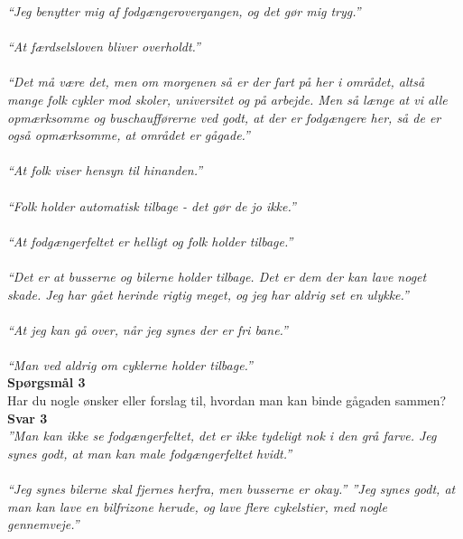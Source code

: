   \emph{“Jeg benytter mig af fodgængerovergangen, og det gør mig tryg.”}
~\\\\
  \emph{“At færdselsloven bliver overholdt.”}
~\\\\
  \emph{“Det må være det, men om morgenen så er der fart på her i området, altså mange folk cykler mod skoler, universitet og på arbejde. Men så længe at vi alle opmærksomme og buschaufførerne ved godt, at der er fodgængere her, så de er også opmærksomme, at området er gågade.”}
~\\\\
  \emph{“At folk viser hensyn til hinanden.”}
~\\\\
  \emph{“Folk holder automatisk tilbage - det gør de jo ikke.”}
~\\\\
  \emph{“At fodgængerfeltet er helligt og folk holder tilbage.”}
~\\\\
  \emph{“Det er at busserne og bilerne holder tilbage. Det er dem der kan lave noget skade. Jeg har gået herinde rigtig meget, og jeg har aldrig set en ulykke.”}
~\\\\
  \emph{“At jeg kan gå over, når jeg synes der er fri bane.”}
~\\\\
  \emph{“Man ved aldrig om cyklerne holder tilbage.”}
  ~\\
  \textbf{Spørgsmål 3}
  ~\\
  Har du nogle ønsker eller forslag til, hvordan man kan binde gågaden sammen?
~\\
  \textbf{Svar 3} ~\\
  \emph{”Man kan ikke se fodgængerfeltet, det er ikke tydeligt nok i den grå farve. Jeg synes godt, at man kan male fodgængerfeltet hvidt.”}
~\\\\
\emph{“Jeg synes bilerne skal fjernes herfra, men busserne er okay.”
  ”Jeg synes godt, at man kan lave en bilfrizone herude, og lave flere cykelstier, med nogle gennemveje.”}
~\\\\

